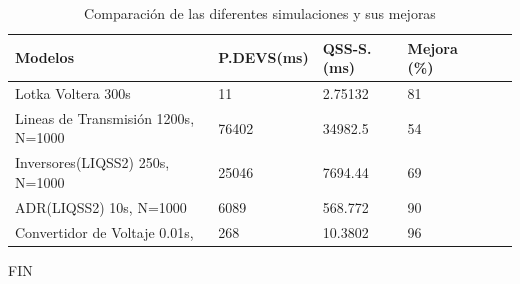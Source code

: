 \documentclass{beamer}
\begin{document}
\begin{frame}
\begin{table}[H]
\centering	
\begin{tabular}{llllll}
\toprule
{\bf Modelos}            &  {\bf P.DEVS(ms)} & {\bf QSS-S. (ms)} & {\bf Mejora (\%)} \\
\toprule
Lotka  Voltera 300s      		& 11            & 2.75132         & 81 \\
Lineas de Transmisión 1200s, N=1000     & 76402         & 34982.5         & 54          \\
Inversores(LIQSS2) 250s, N=1000   	& 25046         & 7694.44         & 69        \\
ADR(LIQSS2) 10s, N=1000 		& 6089          & 568.772         & 90        \\
Convertidor de Voltaje 0.01s,        	& 268           & 10.3802         & 96         

\end{tabular}
\caption{Comparación de las diferentes simulaciones y sus mejoras}\label{tab:result}
\end{table}
\end{frame}

\begin{frame}
FIN
\end{frame}
\end{document}
